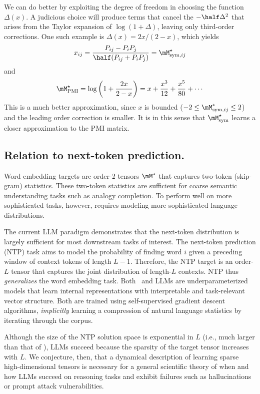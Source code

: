 We can do better by exploiting the degree of freedom in choosing the function $\Delta(x)$. A judicious choice will produce terms that cancel the $-\half \Delta^2$ that arises from the Taylor expansion of $\log (1+\Delta)$, leaving only third-order corrections. One such example is $\Delta(x)=2x/(2-x)$, which yields
\begin{equation}
    x_{ij} = \frac{P_{ij} - P_i P_j}{\half(P_{ij}+P_i P_j)} = \Mstarsymij
\end{equation}
and
\begin{equation}
    \Mstar_\mathrm{PMI} = \log\left(1+\frac{2x}{2-x}\right) = x + \frac{x^3}{12} + \frac{x^5}{80} + \cdots
\end{equation}
This is a much better approximation, since $x$ is bounded ($-2 \leq \Mstarsymij \leq 2$) and the leading order correction is smaller. It is in this sense that $\Mstarsym$ learns a closer approximation to the PMI matrix.

\subsection{Relation to next-token prediction.}

Word embedding targets are order-2 tensors $\Mstar$ that captures two-token (skip-gram) statistics. These two-token statistics are sufficient for coarse semantic understanding tasks such as analogy completion. To perform well on more sophisticated tasks, however, requires modeling more sophisticated language distributions.

The current LLM paradigm demonstrates that the next-token distribution is largely sufficient for most downstream tasks of interest. The next-token prediction (NTP) task aims to model the probability of finding word $i$ given a preceding window of context tokens of length $L-1$. Therefore, the NTP target is an order-$L$ tensor that captures the joint distribution of length-$L$ contexts. NTP thus \textit{generalizes} the word embedding task. Both \wem\ and LLMs are underparameterized models that learn internal representations with interpretable and task-relevant vector structure. Both are trained using self-supervised gradient descent algorithms, \textit{implicitly} learning a compression of natural language statistics by iterating through the corpus.

Although the size of the NTP solution space is exponential in $L$ (i.e., much larger than that of \wem), LLMs succeed because the sparsity of the target tensor increases with $L$. We conjecture, then, that a dynamical description of learning sparse high-dimensional tensors is necessary for a general scientific theory of when and how LLMs succeed on reasoning tasks and exhibit failures such as hallucinations or prompt attack vulnerabilities.